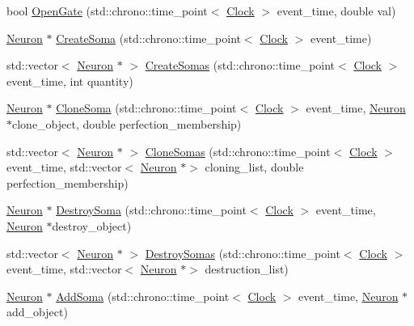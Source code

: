 \begin{DoxyCompactItemize}
bool \hyperlink{class_neuron_a82d0a4739244d79ff929be01eeb0be28}{Open\+Gate} (std\+::chrono\+::time\+\_\+point$<$ \hyperlink{universe_8h_a0ef8d951d1ca5ab3cfaf7ab4c7a6fd80}{Clock} $>$ event\+\_\+time, double val)
\item 
\hyperlink{class_neuron}{Neuron} $\ast$ \hyperlink{class_neuron_a32593a869b25c778c1856c36704f49cf}{Create\+Soma} (std\+::chrono\+::time\+\_\+point$<$ \hyperlink{universe_8h_a0ef8d951d1ca5ab3cfaf7ab4c7a6fd80}{Clock} $>$ event\+\_\+time)
\item 
std\+::vector$<$ \hyperlink{class_neuron}{Neuron} $\ast$ $>$ \hyperlink{class_neuron_a2016d83b02bfe9e5548d5c24ef31dded}{Create\+Somas} (std\+::chrono\+::time\+\_\+point$<$ \hyperlink{universe_8h_a0ef8d951d1ca5ab3cfaf7ab4c7a6fd80}{Clock} $>$ event\+\_\+time, int quantity)
\item 
\hyperlink{class_neuron}{Neuron} $\ast$ \hyperlink{class_neuron_a7706e0f722c70138458423c07b6b153b}{Clone\+Soma} (std\+::chrono\+::time\+\_\+point$<$ \hyperlink{universe_8h_a0ef8d951d1ca5ab3cfaf7ab4c7a6fd80}{Clock} $>$ event\+\_\+time, \hyperlink{class_neuron}{Neuron} $\ast$clone\+\_\+object, double perfection\+\_\+membership)
\item 
std\+::vector$<$ \hyperlink{class_neuron}{Neuron} $\ast$ $>$ \hyperlink{class_neuron_a508841fa635a6e89609c514a79ea59da}{Clone\+Somas} (std\+::chrono\+::time\+\_\+point$<$ \hyperlink{universe_8h_a0ef8d951d1ca5ab3cfaf7ab4c7a6fd80}{Clock} $>$ event\+\_\+time, std\+::vector$<$ \hyperlink{class_neuron}{Neuron} $\ast$$>$ cloning\+\_\+list, double perfection\+\_\+membership)
\item 
\hyperlink{class_neuron}{Neuron} $\ast$ \hyperlink{class_neuron_a6ff7510f73e29c31003b016bdcb4a70e}{Destroy\+Soma} (std\+::chrono\+::time\+\_\+point$<$ \hyperlink{universe_8h_a0ef8d951d1ca5ab3cfaf7ab4c7a6fd80}{Clock} $>$ event\+\_\+time, \hyperlink{class_neuron}{Neuron} $\ast$destroy\+\_\+object)
\item 
std\+::vector$<$ \hyperlink{class_neuron}{Neuron} $\ast$ $>$ \hyperlink{class_neuron_a32b3a98eec58dc66481a2b877a7592cb}{Destroy\+Somas} (std\+::chrono\+::time\+\_\+point$<$ \hyperlink{universe_8h_a0ef8d951d1ca5ab3cfaf7ab4c7a6fd80}{Clock} $>$ event\+\_\+time, std\+::vector$<$ \hyperlink{class_neuron}{Neuron} $\ast$$>$ destruction\+\_\+list)
\item 
\hyperlink{class_neuron}{Neuron} $\ast$ \hyperlink{class_neuron_a6198fa352056e3bbe1e979adf088b900}{Add\+Soma} (std\+::chrono\+::time\+\_\+point$<$ \hyperlink{universe_8h_a0ef8d951d1ca5ab3cfaf7ab4c7a6fd80}{Clock} $>$ event\+\_\+time, \hyperlink{class_neuron}{Neuron} $\ast$add\+\_\+object)

\end{DoxyCompactItemize}

